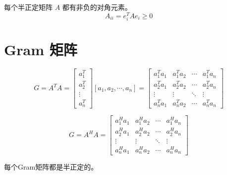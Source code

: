 \begin{theorem}[半正定矩阵对角元素性质]
    每个半正定矩阵 $ A $ 都有非负的对角元素。
\begin{equation}
A_{i i}=e_{i}^{T} A e_{i} \geq 0
\end{equation}
\end{theorem}


\section{Gram 矩阵}

\begin{definition}
    \label{Def:Gram}

    \begin{equation} G=A^{T} A=\left[\begin{array}{c}a_{1}^{T} \\ a_{2}^{T} \\ \vdots \\ a_{n}^{T}\end{array}\right]\left[a_{1}, a_{2}, \cdots, a_{n}\right]=\left[\begin{array}{cccc}a_{1}^{T} a_{1} & a_{1}^{T} a_{2} & \cdots & a_{1}^{T} a_{n} \\ a_{2}^{T} a_{1} & a_{2}^{T} a_{2} & \cdots & a_{2}^{T} a_{n} \\ \vdots & \vdots & \ddots & \vdots \\ a_{n}^{T} a_{1} & a_{n}^{T} a_{2} & \cdots & a_{n}^{T} a_{n}\end{array}\right] \end{equation}
\end{definition}

\begin{definition}
    \begin{equation} G=A^{H} A=\left[\begin{array}{cccc}a_{1}^{H} a_{1} & a_{1}^{H} a_{2} & \cdots & a_{1}^{H} a_{n} \\ a_{2}^{H} a_{1} & a_{2}^{H} a_{2} & \cdots & a_{2}^{H} a_{n} \\ \vdots & \vdots & \ddots & \vdots \\ a_{n}^{H} a_{1} & a_{n}^{H} a_{2} & \cdots & a_{n}^{H} a_{n}\end{array}\right] \end{equation}
\end{definition}

\begin{theorem}
    每个Gram矩阵都是半正定的。
\end{theorem}

